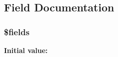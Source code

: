 \subsection{Field Documentation}
\hypertarget{classapp__forums__classes__topics_ab2303c817e3b402b77b7f99627b9c319}{
\subsubsection[{\$fields}]{\setlength{\rightskip}{0pt plus 5cm}\$fields\hspace{0.3cm}{\ttfamily [protected]}}}\label{classapp__forums__classes__topics_ab2303c817e3b402b77b7f99627b9c319}
{\bfseries Initial value\-:}
